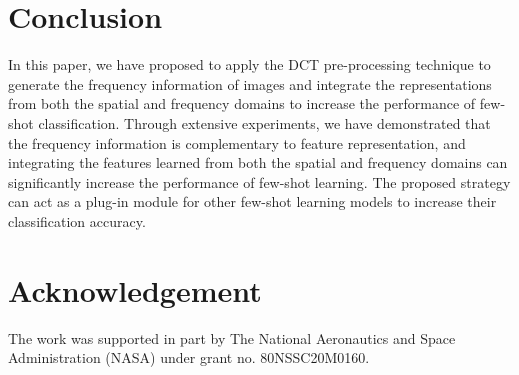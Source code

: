 \documentclass[10pt, conference, compsocconf]{IEEEtran}
\begin{document}
\section{Conclusion}

In this paper, we have proposed to apply the DCT pre-processing technique to generate the frequency information of images and integrate the representations from both the spatial and frequency domains to increase the performance of few-shot classification. Through extensive experiments, we have demonstrated that the frequency information is complementary to feature representation, and integrating the features learned from both the spatial and frequency domains can significantly increase the performance of few-shot learning. The proposed strategy can act as a plug-in module for other few-shot learning models to increase their classification accuracy.




\section*{Acknowledgement}

The work was supported in part by The National Aeronautics and Space Administration (NASA) under grant no. 80NSSC20M0160.
\end{document}
